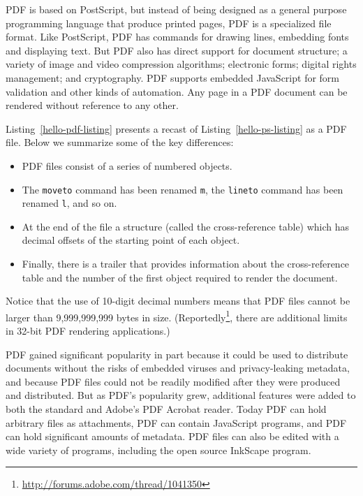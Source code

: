 PDF is based on PostScript, but instead of being designed as a general
purpose programming language that produce printed pages, PDF is a
specialized file format. Like PostScript, PDF has
commands for drawing lines, embedding fonts and displaying text. But PDF also has direct support for
document structure; a variety of image and video compression
algorithms; electronic forms; digital rights management; and
cryptography. PDF supports embedded JavaScript for form validation
and other kinds of automation. Any page in a PDF document can be
rendered without reference to any other. 

Listing~\ref{hello-pdf-listing} presents a recast of
Listing~\ref{hello-ps-listing} as a PDF file. Below we summarize some
of the key differences:

\begin{itemize}
\item PDF files consist of a series of numbered objects. 
\item The \verb|moveto| command has been renamed \verb|m|, the
  \verb|lineto| command has been renamed \verb|l|, and so on.
\item At the end of the file a structure (called the cross-reference
  table) which has decimal offsets of the starting point of each object.
\item Finally, there is a trailer that provides information about the
  cross-reference table and the number of the first object required to
  render the document. 
\end{itemize}

Notice that the use of 10-digit decimal numbers means that PDF files
cannot be larger than 9,999,999,999 bytes in size. (Reportedly\footnote{\url{http://forums.adobe.com/thread/1041350}}, there
are additional limits in 32-bit PDF rendering applications.)





PDF gained significant popularity in part because it could be used to 
distribute documents without the  risks of embedded viruses and
privacy-leaking metadata, and because PDF files could not be readily
modified after they were produced and distributed. But as PDF's popularity grew, additional
features were added to both the standard and Adobe's PDF Acrobat
reader. Today PDF can hold arbitrary files as attachments, PDF can
contain JavaScript programs, and PDF can hold significant amounts of
metadata. PDF files can also be edited with a wide variety of
programs, including the open source InkScape program.


